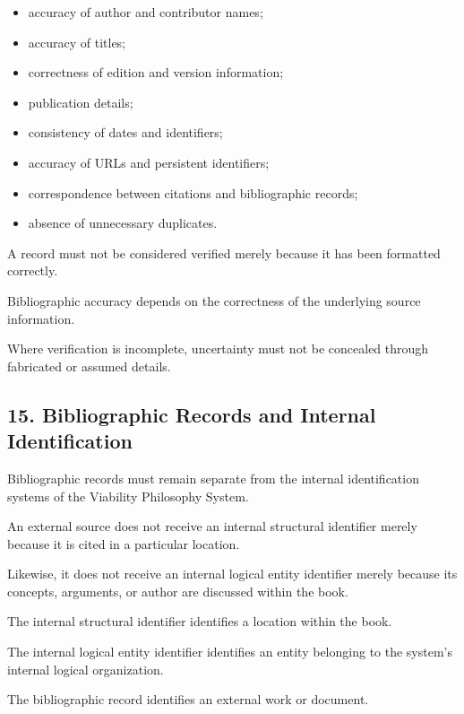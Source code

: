 \begin{itemize}
    \item accuracy of author
    and contributor names;
    \item accuracy of titles;
    \item correctness of
    edition and version
    information;
    \item publication details;
    \item consistency of
    dates and identifiers;
    \item accuracy of URLs
    and persistent identifiers;
    \item correspondence
    between citations
    and bibliographic
    records;
    \item absence of
    unnecessary duplicates.
\end{itemize}

A record must not be
considered verified
merely because it has
been formatted correctly.

Bibliographic accuracy
depends on the correctness
of the underlying
source information.

Where verification
is incomplete, uncertainty
must not be concealed
through fabricated
or assumed details.


\subsection*{15. Bibliographic Records
and Internal Identification}

Bibliographic records
must remain separate
from the internal
identification systems
of the Viability Philosophy
System.

An external source
does not receive an
internal structural
identifier merely
because it is cited
in a particular location.

Likewise, it does not
receive an internal
logical entity identifier
merely because its
concepts, arguments,
or author are discussed
within the book.

The internal structural
identifier identifies
a location within the
book.

The internal logical
entity identifier
identifies an entity
belonging to the
system's internal
logical organization.

The bibliographic record
identifies an external
work or document.

